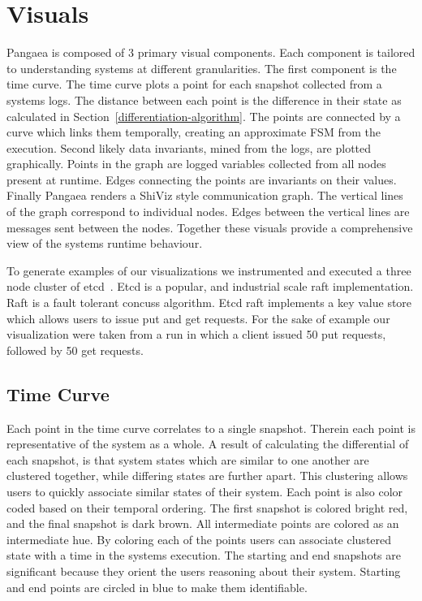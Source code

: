 \section{Visuals}
\label{sec:visuals}

Pangaea is composed of 3 primary visual components. Each component is
tailored to understanding systems at different granularities. The
first component is the time curve. The time curve plots a point for
each snapshot collected from a systems logs. The distance between each
point is the difference in their state as calculated in
Section~\ref{differentiation-algorithm}. The points are connected by a
curve which links them temporally, creating an approximate FSM from
the execution. Second likely data invariants, mined from the logs, are
plotted graphically. Points in the graph are logged variables collected
from all nodes present at runtime. Edges connecting the points are
invariants on their values. Finally Pangaea renders a ShiViz style
communication graph. The vertical lines of the graph correspond to
individual nodes. Edges between the vertical lines are messages sent
between the nodes. Together these visuals provide a comprehensive view
of the systems runtime behaviour.

To generate examples of our visualizations we instrumented and
executed a three node cluster of etcd~\cite{etcdraft}. Etcd is a
popular, and industrial scale raft implementation. Raft is a fault
tolerant concuss algorithm. Etcd raft implements a key value store
which allows users to issue put and get requests. For the sake of
example our visualization were taken from a run in which a client
issued 50 put requests, followed by 50 get requests.

\subsection{Time Curve}
\label{sec:time-curve}


Each point in the time curve correlates to a single snapshot.  Therein
each point is representative of the system as a whole.  A result of
calculating the differential of each snapshot, is that system states
which are similar to one another are clustered together, while
differing states are further apart.  This clustering allows users to
quickly associate similar states of their system. Each point is also
color coded based on their temporal ordering. The first snapshot is
colored bright red, and the final snapshot is dark brown. All
intermediate points are colored as an intermediate hue. By coloring
each of the points users can associate clustered state with a time in
the systems execution. The starting and end snapshots are significant
because they orient the users reasoning about their system. Starting
and end points are circled in blue to make them identifiable.

